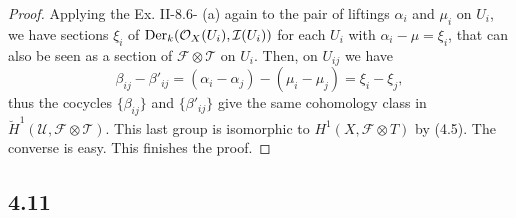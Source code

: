 \documentclass[11pt]{amsart}          %
\newcommand{\calO}{\mathcal{O}}
\newcommand{\calI}{\mathcal{I}}
\newcommand{\calF}{\mathcal{F}}
\newcommand{\calT}{\mathcal{T}}
\newcommand{\calU}{\mathcal{U}}
\newcommand{\der}{{\rm Der}}
\begin{document}
\begin{proof}
Applying the Ex. II-8.6- (a) again to the pair of liftings $\alpha_i$ and $\mu_i$ on $U_i$, we have sections $\xi_i$ of $\der_k (\calO_X (U_i), \calI (U_i))$ for each $U_i$ with $\alpha_i - \mu = \xi_i$, that can also be seen as a section of $\calF \otimes \calT$ on $U_i$. Then, on $U_{ij}$ we have
$$\beta_{ij} - \beta'_{ij} =  (\alpha_i - \alpha_j)  - (\mu_i - \mu_j) = \xi_i - \xi_j,$$ thus the cocycles $\{ \beta_{ij} \}$ and $\{ \beta' _{ij} \}$ give the same cohomology class in $\breve{H} ^1 (\calU, \calF \otimes \calT)$. This last group is isomorphic to $H^1 (X, \calF \otimes T)$ by (4.5). The converse is easy. This finishes the proof.
\end{proof}

\subsection*{4.11}
\end{document}
